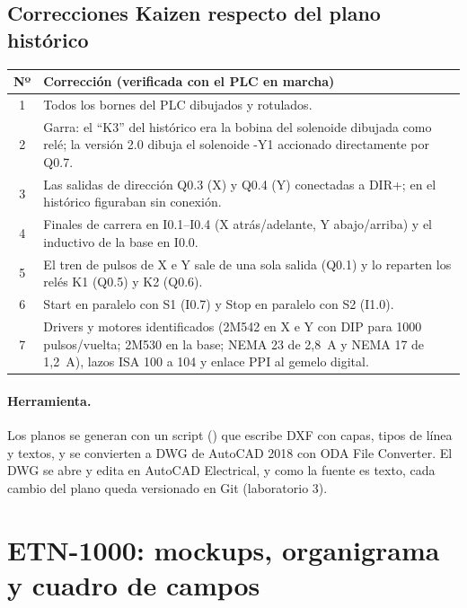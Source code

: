\documentclass[a4paper,11pt]{article}
\begin{document}
\subsection{Correcciones Kaizen respecto del plano histórico}
\begin{center}\small
\begin{tabularx}{\linewidth}{c >{\raggedright\arraybackslash}X}
\toprule
\textbf{Nº} & \textbf{Corrección (verificada con el PLC en marcha)}\\
\midrule
1 & Todos los bornes del PLC dibujados y rotulados.\\
2 & Garra: el ``K3'' del histórico era la bobina del solenoide dibujada como relé; la versión 2.0 dibuja el solenoide -Y1 accionado directamente por Q0.7.\\
3 & Las salidas de dirección Q0.3 (X) y Q0.4 (Y) conectadas a DIR+; en el histórico figuraban sin conexión.\\
4 & Finales de carrera en I0.1--I0.4 (X atrás/adelante, Y abajo/arriba) y el inductivo de la base en I0.0.\\
5 & El tren de pulsos de X e Y sale de una sola salida (Q0.1) y lo reparten los relés K1 (Q0.5) y K2 (Q0.6).\\
6 & Start en paralelo con S1 (I0.7) y Stop en paralelo con S2 (I1.0).\\
7 & Drivers y motores identificados (2M542 en X e Y con DIP para 1000 pulsos/vuelta; 2M530 en la base; NEMA 23 de 2,8~A y NEMA 17 de 1,2~A), lazos ISA 100 a 104 y enlace PPI al gemelo digital.\\
\bottomrule
\end{tabularx}
\end{center}

\paragraph{Herramienta.} Los planos se generan con un script () que escribe DXF con capas, tipos de línea y textos, y se convierten a DWG de AutoCAD 2018 con ODA File Converter. El DWG se abre y edita en AutoCAD Electrical, y como la fuente es texto, cada cambio del plano queda versionado en Git (laboratorio 3).

\section{ETN-1000: mockups, organigrama y cuadro de campos}
\end{document}
